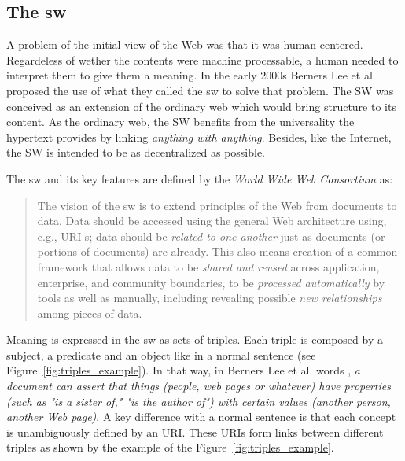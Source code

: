 \subsection{The \acl{sw}}

A problem of the initial view of the Web was that it was human-centered.
Regardeless of wether the contents were machine processable, a human needed to interpret them to give them a meaning.
In the early 2000s Berners Lee et al. \citep{berners-lee_semantic_2001} proposed the use of what they called the \acf{sw} to solve that problem.
The SW was conceived as an extension of the ordinary web which would bring structure to its content.
As the ordinary web, the SW benefits from the universality the hypertext provides by linking \emph{anything with anything}.
Besides, like the Internet, the SW is intended to be as decentralized as possible.

The \acl{sw} and its key features are defined by the \emph{World Wide Web Consortium} \citep{semanticWeb-FAQ} as:
\begin{quote}
The vision of the \acl{sw} is to extend principles of the Web from documents to data.
Data should be accessed using the general Web architecture using, e.g., URI-s;
data should be \emph{related to one another} just as documents (or portions of documents) are already.
This also means creation of a common framework that allows data to be \emph{shared and reused} across application, enterprise, and community boundaries,
to be \emph{processed automatically} by tools as well as manually, including revealing possible \emph{new relationships} among pieces of data.
\end{quote}

Meaning is expressed in the \acl{sw} as sets of triples.
Each triple is composed by a subject, a predicate and an object like in a normal sentence (see Figure~\ref{fig:triples_example}).
In that way, in Berners Lee et al. words \citep{berners-lee_semantic_2001}, \emph{a document can assert that things (people, web pages or whatever) have properties (such as "is a sister of," "is the author of") with certain values (another person, another Web page)}.
A key difference with a normal sentence is that each concept is unambiguously defined by an URI.
These URIs form links between different triples as shown by the example of the Figure~\ref{fig:triples_example}.


